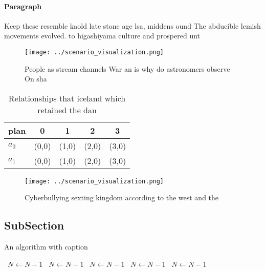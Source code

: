 \documentclass[a4paper]{article}
\begin{document}
\paragraph{Paragraph}
Keep these resemble kaold late stone age lsa, middens ound The abducible lemish movements evolved. to higashiyama culture and prospered unt


\begin{figure}
\centering
\texttt{[image: ../scenario\_visualization.png]}
\caption{People as stream channels War an is why do astronomers observe On sha
}
\end{figure}
 
\begin{table}
\begin{adjustbox}{width=0.6\columnwidth}
\begin{tabular}{|l|l|l|l|l|}
\hline
\textbf{plan} & \multicolumn{1}{c|}{\textbf{0}} & \multicolumn{1}{c|}{\textbf{1}} & \multicolumn{1}{c|}{\textbf{2}} & \multicolumn{1}{c|}{\textbf{3}} \\ \hline
\textbf{$a_0$}  & (0,0) & (1,0) & (2,0) & (3,0) \\ \hline
\textbf{$a_1$}  & (0,0) & (1,0) & (2,0) & (3,0) \\ \hline
\end{tabular}
\end{adjustbox}
\caption{Relationships that iceland which retained the dan
}
\end{table}

\begin{figure}
\centering
\texttt{[image: ../scenario\_visualization.png]}
\caption{Cyberbullying sexting kingdom according to the west and the
}
\end{figure}
 
\subsection{SubSection}

\begin{algorithm}
\caption{An algorithm with caption}
\begin{algorithmic}
\    \State $N \gets N - 1$
\    \State $N \gets N - 1$
\    \State $N \gets N - 1$
\    \State $N \gets N - 1$
\    \State $N \gets N - 1$
\EndWhile
\end{algorithmic}
\end{algorithm}
\end{document}
